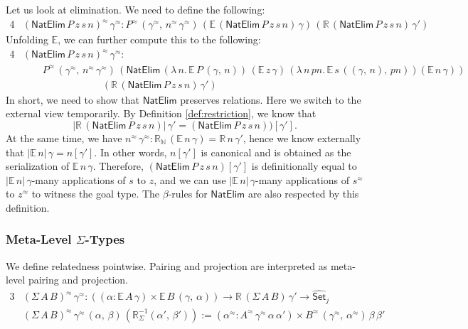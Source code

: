 \documentclass[acmsmall,screen]{acmart}
\newcommand{\mit}[1]{\mathit{#1}}
\newcommand{\msf}[1]{\mathsf{#1}}
\newcommand{\mbb}[1]{\mathbb{#1}}
\newcommand{\wh}[1]{\widehat{#1}}
\newcommand{\Set}{\mathsf{Set}}
\newcommand{\ev}{\mbb{E}}
\newcommand{\re}{\mbb{R}}
\theoremstyle{remark}
\newcommand{\whset}{\wh{\Set}}
\newcommand{\rel}{^{\approx}}
\begin{document}
Let us look at elimination. We need to define the following:
\begin{alignat*}{4}
  &(\msf{NatElim}\,P\,z\,s\,n)\rel\,\gamma\rel :
  P\rel\,(\gamma\rel,\,n\rel\,\gamma\rel)\,(\ev\,(\msf{NatElim}\,P\,z\,s\,n)\,\gamma)\,
                                           (\re\,(\msf{NatElim}\,P\,z\,s\,n)\,\gamma')
\end{alignat*}
Unfolding $\ev$, we can further compute this to the following:
\begin{alignat*}{4}
  &(\msf{NatElim}\,P\,z\,s\,n)\rel\,\gamma\rel : \\
  &\hspace{2em}P\rel\,(\gamma\rel,\,n\rel\,\gamma\rel)\,
  (\msf{NatElim}\,(\lambda\,n.\,\ev\,P\,(\gamma,\,n))\,
                  (\ev\,z\,\gamma)\,
                  (\lambda\,n\,\mit{pn}.\,\ev\,s\,((\gamma,\,n),\,\mit{pn}))
                  (\ev\,n\,\gamma))\\
  &\hspace{8em}(\re\,(\msf{NatElim}\,P\,z\,s\,n)\,\gamma')
\end{alignat*}
In short, we need to show that $\msf{NatElim}$ preserves relations. Here we
switch to the external view temporarily. By Definition \ref{def:restriction}, we know that
\[
   |\re\,(\msf{NatElim}\,P\,z\,s\,n)|\,\gamma' = (\msf{NatElim}\,P\,z\,s\,n))[\gamma'].
\]
At the same time, we have $n\rel\,\gamma\rel : \re_{\mbb{N}}\,(\ev\,n\,\gamma) =
\re\,n\,\gamma'$, hence we know externally that $|\ev\,n|\,\gamma = n[\gamma']$.
In other words, $n[\gamma']$ is canonical and is obtained as the serialization
of $\ev\,n\,\gamma$. Therefore, $(\msf{NatElim}\,P\,z\,s\,n)[\gamma']$ is
definitionally equal to $|\ev\,n|\,\gamma$-many applications of $s$ to
$z$, and we can use $|\ev\,n|\,\gamma$-many applications of $s\rel$ to $z\rel$
to witness the goal type. The $\beta$-rules for $\msf{NatElim}$ are also respected
by this definition.

\subsubsection{Meta-Level $\Sigma$-Types} We define relatedness pointwise. Pairing and projection
are interpreted as meta-level pairing and projection.
\begin{alignat*}{3}
  &(\Sigma\,A\,B)\rel\,\gamma\rel : ((\alpha : \ev\,A\,\gamma) \times \ev\,B\,(\gamma,\,\alpha))
             \to \re\,(\Sigma\,A\,B)\,\gamma' \to \whset_j\\
  &(\Sigma\,A\,B)\rel\,\gamma\rel\,(\alpha,\,\beta)\,(\re_{\Sigma}^{-1}(\alpha',\,\beta')) :=
             (\alpha\rel : A\rel\,\gamma\rel\,\alpha\,\alpha') \times B\rel\,(\gamma\rel,\,\alpha\rel)\,\beta\,\beta'
\end{alignat*}
\end{document}

